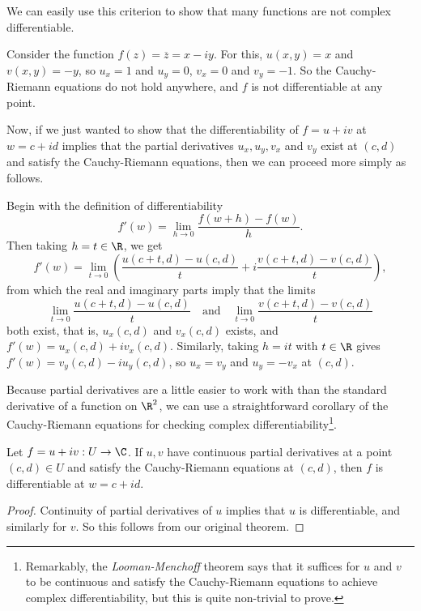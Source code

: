 We can easily use this criterion to show that many functions are not complex differentiable.

\begin{example}
    Consider the function $f(z) = \overline{z} = x - iy$. For this, $u(x, y) = x$ and $v(x, y) = -y$, so $u_x = 1$ and $u_y = 0$, $v_x = 0$ and $v_y = -1$. So the Cauchy-Riemann equations do not hold anywhere, and $f$ is not differentiable at any point.
\end{example}

Now, if we just wanted to show that the differentiability of $f = u + iv$ at $w = c + id$ implies that the partial derivatives $u_x, u_y, v_x$ and $v_y$ exist at $(c, d)$ and satisfy the Cauchy-Riemann equations, then we can proceed more simply as follows. 

Begin with the definition of differentiability
$$
f'(w) = \lim_{h \to 0} \frac{f(w + h) - f(w)}{h}.
$$
Then taking $h = t \in \R$, we get
$$
f'(w) = \lim_{t \to 0} \left(
\frac{u(c + t, d) - u(c, d)}{t} + i \frac{v(c + t, d) - v(c, d)}{t}
\right),
$$
from which the real and imaginary parts imply that the limits
$$
\lim _{t \rightarrow 0} \frac{u(c+t, d)-u(c, d)}{t} \quad \text{and} \quad \lim_{t \rightarrow 0} \frac{v(c+t, d)-v(c, d)}{t}
$$
both exist, that is, $u_x(c, d)$ and $v_x(c, d)$ exists, and $f'(w) = u_x(c, d) + i v_x(c, d)$. 
Similarly, taking $h = it$ with $t \in \R$ gives $f'(w) = v_y(c, d) - i u_y(c, d)$, so $u_x = v_y$ and $u_y = -v_x$ at $(c, d)$.


Because partial derivatives are a little easier to work with than the standard derivative of a function on $\R^2$, we can use a straightforward corollary of the Cauchy-Riemann equations for checking complex differentiability\footnote{Remarkably, the \emph{Looman-Menchoff} theorem says that it suffices for $u$ and $v$ to be continuous and satisfy the Cauchy-Riemann equations to achieve complex differentiability, but this is quite non-trivial to prove.}.

\begin{corollary}
    Let $f = u + iv: U \rightarrow \C$. If $u, v$ have continuous partial derivatives at a point $(c ,d) \in U$ and satisfy the Cauchy-Riemann equations at $(c, d)$, then $f$ is differentiable at $w = c + id$.
\end{corollary}
\begin{proof}
    Continuity of partial derivatives of $u$ implies that $u$ is differentiable, and similarly for $v$. So this follows from our original theorem.
\end{proof}

